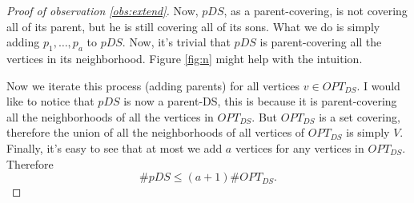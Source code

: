 \documentclass[11pt]{article}
\begin{document}
\begin{enumerate}
\begin{proof}[Proof of observation \ref{obs:extend}]
        Now, $pDS$, as a parent-covering, is not covering all of its parent, but he is still covering all of its sons. What we do is simply adding $p_1,\dots,p_a$ to $pDS$. Now, it's trivial that $pDS$ is parent-covering all the vertices in its neighborhood. Figure \ref{fig:n} might help with the intuition.

        Now we iterate this process (adding parents) for all vertices $v \in OPT_{DS}$. I would like to notice that $pDS$ is now a parent-DS, this is because it is parent-covering all the neighborhoods of all the vertices in $OPT_{DS}$. But $OPT_{DS}$ is a set covering, therefore the union of all the neighborhoods of all vertices of $OPT_{DS}$ is simply $V$.
        Finally, it's easy to see that at most we add $a$ vertices for any vertices in $OPT_{DS}$. Therefore
        \begin{equation*}
            \#pDS \leq (a+1) \# OPT_{DS}.
        \end{equation*}
    \end{proof}
\end{enumerate}
\end{document}
